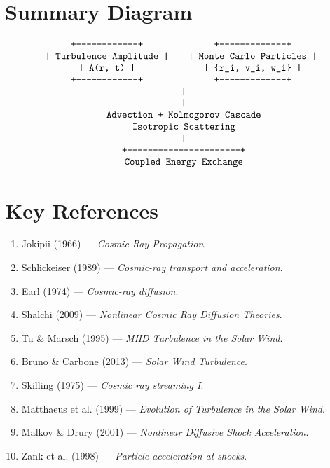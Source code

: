 \section*{\texorpdfstring{ \textbf{Summary Diagram}}{}}
\[
\begin{array}{c@{\qquad}c}
\texttt{+------------------------+} & \texttt{+--------------------------+} \\
\texttt{|  Turbulence Amplitude  |} & \texttt{|  Monte Carlo Particles   |} \\
\texttt{|      A(r, t)           |} & \texttt{|  \{r\_i, v\_i, w\_i\}     |} \\
\texttt{+------------------------+} & \texttt{+--------------------------+} \\
\multicolumn{2}{c}{\texttt{                    |}} \\
\multicolumn{2}{c}{\texttt{                    |}} \\
\multicolumn{2}{c}{\texttt{         Advection + Kolmogorov Cascade}} \\
\multicolumn{2}{c}{\texttt{              Isotropic Scattering}} \\
\multicolumn{2}{c}{\texttt{                    |}} \\
\multicolumn{2}{c}{\texttt{    +-------------------------------------------+}} \\
\multicolumn{2}{c}{\texttt{            Coupled Energy Exchange}} \\
\end{array}
\]

\section*{\texorpdfstring{ \textbf{Key References}}{}}

\begin{enumerate}
    \item Jokipii (1966) --- \textit{Cosmic-Ray Propagation}.
    \item Schlickeiser (1989) --- \textit{Cosmic-ray transport and acceleration}.
    \item Earl (1974) --- \textit{Cosmic-ray diffusion}.
    \item Shalchi (2009) --- \textit{Nonlinear Cosmic Ray Diffusion Theories}.
    \item Tu \& Marsch (1995) --- \textit{MHD Turbulence in the Solar Wind}.
    \item Bruno \& Carbone (2013) --- \textit{Solar Wind Turbulence}.
    \item Skilling (1975) --- \textit{Cosmic ray streaming I}.
    \item Matthaeus et al. (1999) --- \textit{Evolution of Turbulence in the Solar Wind}.
    \item Malkov \& Drury (2001) --- \textit{Nonlinear Diffusive Shock Acceleration}.
    \item Zank et al. (1998) --- \textit{Particle acceleration at shocks}.
\end{enumerate}

